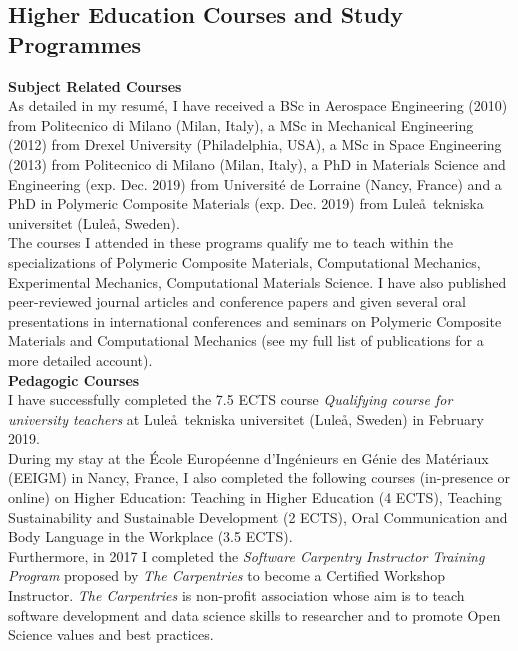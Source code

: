 \documentclass[
  a4paper, 
]{fortysecondscv}
\begin{document}
\subsection{Higher Education Courses and Study Programmes}
\textbf{Subject Related Courses}\\
As detailed in my resum\'e, I have received a BSc in Aerospace Engineering (2010) from Politecnico di Milano (Milan, Italy), a MSc in Mechanical Engineering (2012) from Drexel University (Philadelphia, USA), a MSc in Space Engineering (2013) from Politecnico di Milano (Milan, Italy), a PhD in Materials Science and Engineering (exp. Dec. 2019) from Universit\'e de Lorraine (Nancy, France) and a PhD in Polymeric Composite Materials (exp. Dec. 2019) from Lule\aa\ tekniska universitet (Lule\aa, Sweden).\\The courses I attended in these programs qualify me to teach within the specializations of Polymeric Composite Materials, Computational Mechanics, Experimental Mechanics, Computational Materials Science. I have also published peer-reviewed journal articles and conference papers and given several oral presentations in international conferences and seminars on Polymeric Composite Materials and Computational Mechanics (see my full list of publications for a more detailed account).\\[2pt]
\textbf{Pedagogic Courses}\\
I have successfully completed the 7.5 ECTS course \emph{Qualifying course for university teachers} at Lule\aa\ tekniska universitet (Lule\aa, Sweden) in February 2019.\\During my stay at the \'Ecole Europ\'eenne d'Ing\'enieurs en G\'enie des Mat\'eriaux (EEIGM) in Nancy, France, I also completed the following courses (in-presence or online) on Higher Education: Teaching in Higher Education (4 ECTS), Teaching Sustainability and Sustainable Development (2 ECTS), Oral Communication and Body Language in the Workplace (3.5 ECTS).\\Furthermore, in 2017 I completed the \textit{Software Carpentry Instructor Training Program} proposed by \textit{The Carpentries} to become a Certified Workshop Instructor. \textit{The Carpentries} is non-profit association whose aim is to teach software development and data science skills to researcher and to promote Open Science values and best practices.

\newpage
\makebacksidebar
\hrulefill\hspace{5pt}\textbf{\thepage}
\end{document}
